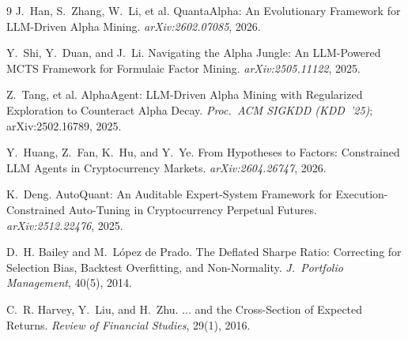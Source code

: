 \documentclass[11pt]{article}
\begin{document}
\begin{thebibliography}{9}
\small
{}
J.~Han, S.~Zhang, W.~Li, et al.
\newblock QuantaAlpha: An Evolutionary Framework for LLM-Driven Alpha Mining.
\newblock \emph{arXiv:2602.07085}, 2026.

Y.~Shi, Y.~Duan, and J.~Li.
\newblock Navigating the Alpha Jungle: An LLM-Powered MCTS Framework for Formulaic
Factor Mining.
\newblock \emph{arXiv:2505.11122}, 2025.

Z.~Tang, et al.
\newblock AlphaAgent: LLM-Driven Alpha Mining with Regularized Exploration to
Counteract Alpha Decay.
\newblock \emph{Proc.\ ACM SIGKDD (KDD~'25)}; arXiv:2502.16789, 2025.

Y.~Huang, Z.~Fan, K.~Hu, and Y.~Ye.
\newblock From Hypotheses to Factors: Constrained LLM Agents in Cryptocurrency Markets.
\newblock \emph{arXiv:2604.26747}, 2026.

K.~Deng.
\newblock AutoQuant: An Auditable Expert-System Framework for Execution-Constrained
Auto-Tuning in Cryptocurrency Perpetual Futures.
\newblock \emph{arXiv:2512.22476}, 2025.

D.~H. Bailey and M.~L\'opez de Prado.
\newblock The Deflated Sharpe Ratio: Correcting for Selection Bias, Backtest
Overfitting, and Non-Normality.
\newblock \emph{J.\ Portfolio Management}, 40(5), 2014.

C.~R. Harvey, Y.~Liu, and H.~Zhu.
\newblock $\ldots$ and the Cross-Section of Expected Returns.
\newblock \emph{Review of Financial Studies}, 29(1), 2016.
\end{thebibliography}
\end{document}
